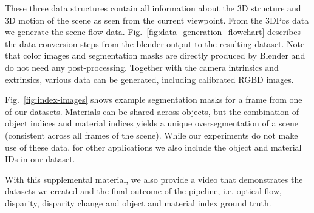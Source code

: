 \documentclass[10pt,twocolumn,letterpaper]{article}
\begin{document}
These three data structures contain all information about the 3D structure and 3D motion of the scene as seen from the current viewpoint. 
From the 3DPos data we generate the scene flow data.
Fig.~\ref{fig:data_generation_flowchart} describes the data conversion steps from the blender output to the resulting dataset. 
Note that color images and segmentation masks are directly produced by Blender and do not need any post-processing. 
Together with the camera intrinsics and extrinsics, various data can be generated, including calibrated RGBD images.


\begin{figure*}%
  \begin{center}%
  \end{center}%
  \caption{\textbf{Data generation overview for a single view at frame time $\mathbf{t}$}: 
           Blender directly outputs the \emph{Final pass} and \emph{Clean pass} images, as well as the object-level and material-level \emph{segmentation masks}.
           \emph{Disparity} is directly obtained from depth, which is given by the $Z$ channel of the current 3DPos map as described in Fig.~\ref{fig:pos3d-images} ($b$ is the stereo baseline, $f$ denotes the focal length).
           Subtracting the current disparity map from the future/past disparity map results in the \emph{disparity change} in future/past direction.
           The original 3DPos images are projected from camera space into pixel space using the camera intrinsics matrix $K$.
           Subtracting the current pixel position image from the future/past pixel position images yields the \emph{optical flow} into the future/past.
          }%
  \label{fig:data_generation_flowchart}%
\end{figure*}%


Fig.~\ref{fig:index-images} shows example segmentation masks for a frame from one of our datasets.
Materials can be shared across objects, but the combination of object indices and material indices yields a unique oversegmentation of a scene (consistent across all frames of the scene).
While our experiments do not make use of these data, for other applications we also include the object and material IDs in our dataset.

With this supplemental material, we also provide a video that demonstrates the
datasets we created and the final outcome of the pipeline, i.e. optical flow, disparity, disparity change and object and material index ground truth. 
\end{document}
